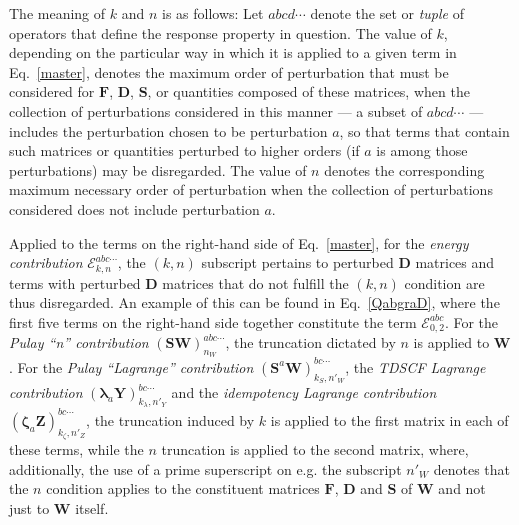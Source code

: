 \documentclass[%
 reprint,
 amsmath,amssymb,
 aps,
]{revtex4-1}
\begin{document}
The meaning of $k$ and $n$ is as follows: Let $abcd\cdots$ denote the set or \textit{tuple} of operators that define the response property in question. The value of $k$, depending on the particular way in which it is applied to a given term in Eq.~\eqref{master}, denotes the maximum order of perturbation that must be considered for $\mathbf{F}$, $\mathbf{D}$, $\mathbf{S}$, or quantities composed of these matrices, when the collection of perturbations considered in this manner --- a subset of $abcd\cdots$ --- includes the perturbation chosen to be perturbation $a$, so that terms that contain such matrices or quantities perturbed to higher orders (if $a$ is among those perturbations) may be disregarded. The value of $n$ denotes the corresponding maximum necessary order of perturbation when the collection of perturbations considered does not include perturbation $a$.

Applied to the terms on the right-hand side of Eq.~\eqref{master}, for the \textit{energy contribution} $\mathcal{E}_{k,n}^{abc\cdots}$, the $(k,n)$ subscript pertains to perturbed $\mathbf{D}$ matrices and terms with perturbed $\mathbf{D}$ matrices that do not fulfill the $(k,n)$ condition are thus disregarded. An example of this can be found in Eq.~\eqref{QabgraD}, where the first five terms on the right-hand side together constitute the term $\mathcal{E}_{0,2}^{abc}$. For the \textit{Pulay ``n'' contribution}  $(\mathbf{SW})_{n_{W}}^{abc\cdots}$, the truncation dictated by $n$ is applied to $\mathbf{W}$. For the \textit{Pulay ``Lagrange'' contribution} $(\mathbf{S}^{a}\mathbf{W})_{k_{S},n'_{W}}^{bc\cdots}$, the \textit{TDSCF Lagrange contribution} $(\mathbf{\lambda}_{a}\mathbf{Y})_{k_{\lambda},n'_{Y}}^{bc\cdots}$ and the \textit{idempotency Lagrange contribution} $(\mathbf{\zeta}_{a}\mathbf{Z})_{k_{\zeta},n'_{Z}}^{bc\cdots}$, the truncation induced by $k$ is applied to the first matrix in each of these terms, while the $n$ truncation is applied to the second matrix, where, additionally, the use of a prime superscript on e.g. the subscript $n'_{W}$ denotes that the $n$ condition applies to the constituent matrices $\mathbf{F}$, $\mathbf{D}$ and $\mathbf{S}$ of $\mathbf{W}$ and not just to $\mathbf{W}$ itself.
\end{document}
